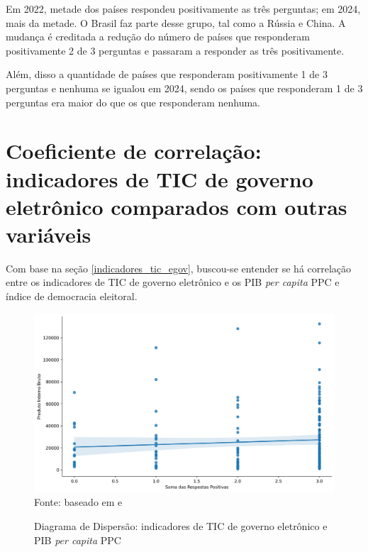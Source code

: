Em 2022, metade dos países respondeu positivamente as três perguntas; em 2024, mais da metade. O Brasil faz parte desse grupo, tal como a Rússia e China. A mudança é creditada a redução do número de países que responderam positivamente 2 de 3 perguntas e passaram a responder as três positivamente. 

Além, disso a quantidade de países que responderam positivamente 1 de 3 perguntas e nenhuma se igualou em 2024, sendo os países que responderam 1 de 3 perguntas era maior do que os que responderam nenhuma.

\section{Coeficiente de correlação: indicadores de TIC de governo eletrônico comparados com outras variáveis}

Com base na seção \ref{indicadores_tic_egov}, buscou-se entender se há correlação entre os indicadores de TIC de governo eletrônico e os PIB \textit{per capita} PPC e índice de democracia eleitoral.

\begin{figure}[H]
	\centering
	\caption{Diagrama de Dispersão: indicadores de TIC de governo eletrônico e PIB \textit{per capita} PPC}
	\includegraphics[width=1\linewidth]{figuras/ict_in_government/dispersao_ticegov_pib}
	\label{fig:dispersao_ticegov_pib}
	\footnotesize{Fonte: baseado em \cite{WB_pib_per_capita_países} e \cite{ONU_ICT_in_government_indicators}}
\end{figure}

